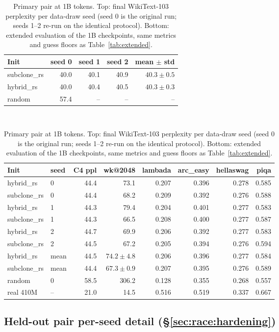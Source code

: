 \begin{table}[h]
\centering
\footnotesize
\caption{Primary pair at 1B tokens. Top: final WikiText-103 perplexity per
data-draw seed (seed 0 is the original run; seeds 1--2 re-run on the identical
protocol). Bottom: extended evaluation of the 1B checkpoints, same metrics and
guess floors as Table~\ref{tab:extended}.}
\label{tab:conv1b}
\begin{tabular}{lrrrr}
\toprule
Init & seed 0 & seed 1 & seed 2 & mean $\pm$ std \\
\midrule
subclone\_rs & 40.0 & 40.1 & 40.9 & $40.3 \pm 0.5$ \\
hybrid\_rs   & 40.0 & 40.4 & 40.5 & $40.3 \pm 0.3$ \\
random       & 57.4 & --   & --   & -- \\
\bottomrule
\end{tabular}
\\[6pt]
\begin{tabular}{llrrrrrr}
\toprule
Init & seed & C4 ppl & wk@2048 & lambada & arc\_easy & hellaswag & piqa \\
\midrule
hybrid\_rs   & 0 & 44.4 & 73.1 & 0.207 & 0.396 & 0.278 & 0.585 \\
subclone\_rs & 0 & 44.4 & 68.2 & 0.209 & 0.392 & 0.276 & 0.588 \\
hybrid\_rs   & 1 & 44.3 & 79.4 & 0.204 & 0.401 & 0.277 & 0.583 \\
subclone\_rs & 1 & 44.3 & 66.5 & 0.208 & 0.400 & 0.277 & 0.587 \\
hybrid\_rs   & 2 & 44.7 & 69.9 & 0.206 & 0.392 & 0.277 & 0.583 \\
subclone\_rs & 2 & 44.5 & 67.2 & 0.205 & 0.394 & 0.276 & 0.594 \\
\midrule
hybrid\_rs   & mean & 44.5 & $74.2\pm4.8$ & 0.206 & 0.396 & 0.277 & 0.584 \\
subclone\_rs & mean & 44.4 & $67.3\pm0.9$ & 0.207 & 0.395 & 0.276 & 0.589 \\
random       & 0 & 58.5 & 306.2 & 0.128 & 0.355 & 0.268 & 0.557 \\
\midrule
real 410M    & -- & 21.0 & 14.5 & 0.516 & 0.519 & 0.337 & 0.667 \\
\bottomrule
\end{tabular}
\end{table}

\subsection{Held-out pair per-seed detail (\S\ref{sec:race:hardening})}
\label{app:unseen}


